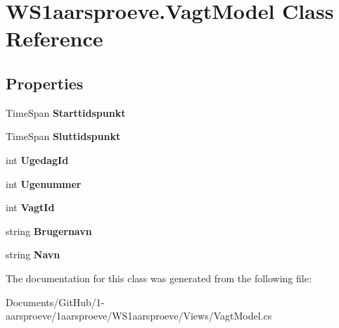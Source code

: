 \hypertarget{class_w_s1aarsproeve_1_1_vagt_model}{}\section{W\+S1aarsproeve.\+Vagt\+Model Class Reference}
\label{class_w_s1aarsproeve_1_1_vagt_model}
\subsection*{Properties}
\begin{DoxyCompactItemize}
\item 
\hypertarget{class_w_s1aarsproeve_1_1_vagt_model_a9bef9be6e818120680601cf81cf5ec76}{}Time\+Span {\bfseries Starttidspunkt}\label{class_w_s1aarsproeve_1_1_vagt_model_a9bef9be6e818120680601cf81cf5ec76}

\item 
\hypertarget{class_w_s1aarsproeve_1_1_vagt_model_a7e28b590ba1c43b2bf7a1294a282bb16}{}Time\+Span {\bfseries Sluttidspunkt}\label{class_w_s1aarsproeve_1_1_vagt_model_a7e28b590ba1c43b2bf7a1294a282bb16}

\item 
\hypertarget{class_w_s1aarsproeve_1_1_vagt_model_af3566f5046a227e1dbffcc072be47e52}{}int {\bfseries Ugedag\+Id}\label{class_w_s1aarsproeve_1_1_vagt_model_af3566f5046a227e1dbffcc072be47e52}

\item 
\hypertarget{class_w_s1aarsproeve_1_1_vagt_model_a4c21b746392ca2cfea32db1e44e90633}{}int {\bfseries Ugenummer}\label{class_w_s1aarsproeve_1_1_vagt_model_a4c21b746392ca2cfea32db1e44e90633}

\item 
\hypertarget{class_w_s1aarsproeve_1_1_vagt_model_a49d1eccdeb06e159a1fc10ce3458f203}{}int {\bfseries Vagt\+Id}\label{class_w_s1aarsproeve_1_1_vagt_model_a49d1eccdeb06e159a1fc10ce3458f203}

\item 
\hypertarget{class_w_s1aarsproeve_1_1_vagt_model_a01096645420eee439a62d8929f55117f}{}string {\bfseries Brugernavn}\label{class_w_s1aarsproeve_1_1_vagt_model_a01096645420eee439a62d8929f55117f}

\item 
\hypertarget{class_w_s1aarsproeve_1_1_vagt_model_a71e4042bbfe1264de6f3be6ff3ddd0bc}{}string {\bfseries Navn}\label{class_w_s1aarsproeve_1_1_vagt_model_a71e4042bbfe1264de6f3be6ff3ddd0bc}

\end{DoxyCompactItemize}


The documentation for this class was generated from the following file\+:\begin{DoxyCompactItemize}
\item 
Documents/\+Git\+Hub/1-\/aarsproeve/1aarsproeve/\+W\+S1aarsproeve/\+Views/Vagt\+Model.\+cs\end{DoxyCompactItemize}
